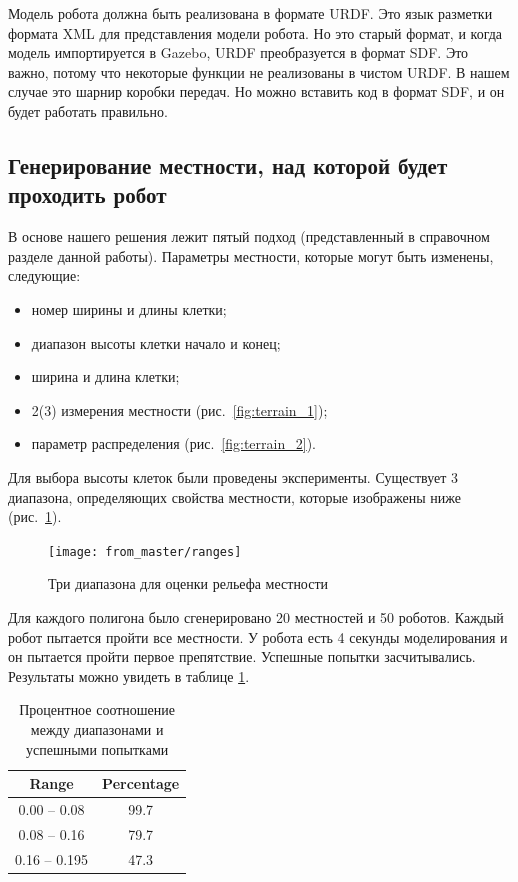 Модель робота должна быть реализована в формате URDF. Это язык разметки формата XML для представления модели робота. Но это старый формат, и когда модель импортируется в Gazebo, URDF преобразуется в формат SDF. Это важно, потому что некоторые функции не реализованы в чистом URDF. В нашем случае это шарнир коробки передач. Но можно вставить код в формат SDF, и он будет работать правильно.

\subsection{Генерирование местности, над которой будет проходить робот}
В основе нашего решения лежит пятый подход (представленный в справочном разделе данной работы).
Параметры местности, которые могут быть изменены, следующие:
\begin{itemize}
\item номер ширины и длины клетки;
\item диапазон высоты клетки начало и конец;
\item ширина и длина клетки;
\item 2(3) измерения местности (рис.~\ref{fig:terrain_1});
\item параметр распределения (рис.~\ref{fig:terrain_2}).
\end{itemize}

Для выбора высоты клеток были проведены эксперименты.
Существует 3 диапазона, определяющих свойства местности, которые изображены ниже (рис.~\ref{fig:range}).

\begin{figure}[H]
\centering\texttt{[image: from\_master/ranges]}\\
\caption{Три диапазона для оценки рельефа местности}
\label{fig:range}
\end{figure}

Для каждого полигона было сгенерировано 20 местностей и 50 роботов. Каждый робот пытается пройти все местности. У робота есть 4 секунды моделирования и он пытается пройти первое препятствие. Успешные попытки засчитывались. Результаты можно увидеть в таблице \ref{tabular:ranges}.

\begin{table}[H]
\caption{Процентное соотношение между диапазонами и успешными попытками}
\label{tabular:ranges}
\begin{center}
\begin{tabular}{c|c}
 \textbf{Range} & \textbf{Percentage}\\
 \hline
0.00 -- 0.08 & 99.7 \\ 
0.08 -- 0.16 & 79.7 \\
0.16 -- 0.195 & 47.3 \\
\end{tabular}
\end{center}
\end{table}


